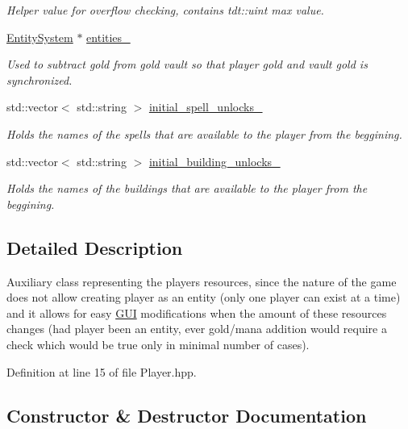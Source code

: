 \begin{DoxyCompactItemize}
\begin{DoxyCompactList}\small\item\em Helper value for overflow checking, contains tdt\+::uint max value. \end{DoxyCompactList}\item 
\hyperlink{class_entity_system}{Entity\+System} $\ast$ \hyperlink{class_player_a8cd7c8279757296dc744e61246c42390}{entities\+\_\+}
\begin{DoxyCompactList}\small\item\em Used to subtract gold from gold vault so that player gold and vault gold is synchronized. \end{DoxyCompactList}\item 
std\+::vector$<$ std\+::string $>$ \hyperlink{class_player_a033fee5620fae5422d74ed491c02cf12}{initial\+\_\+spell\+\_\+unlocks\+\_\+}
\begin{DoxyCompactList}\small\item\em Holds the names of the spells that are available to the player from the beggining. \end{DoxyCompactList}\item 
std\+::vector$<$ std\+::string $>$ \hyperlink{class_player_aeb4a160d13c6aca9c2e25cd76cdda735}{initial\+\_\+building\+\_\+unlocks\+\_\+}
\begin{DoxyCompactList}\small\item\em Holds the names of the buildings that are available to the player from the beggining. \end{DoxyCompactList}\end{DoxyCompactItemize}


\subsection{Detailed Description}
Auxiliary class representing the player\textquotesingle{}s resources, since the nature of the game does not allow creating player as an entity (only one player can exist at a time) and it allows for easy \hyperlink{class_g_u_i}{G\+UI} modifications when the amount of these resources changes (had player been an entity, ever gold/mana addition would require a check which would be true only in minimal number of cases). 

Definition at line 15 of file Player.\+hpp.



\subsection{Constructor \& Destructor Documentation}
